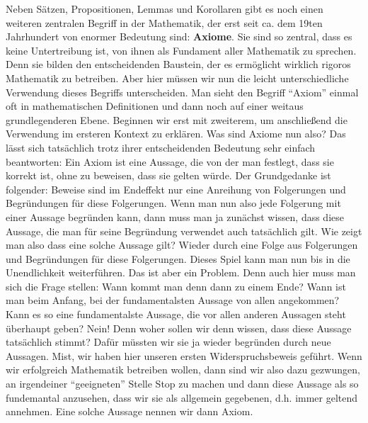 Neben Sätzen, Propositionen, Lemmas und Korollaren gibt es noch einen weiteren zentralen Begriff in der Mathematik, der erst seit ca. dem 19ten Jahrhundert von enormer Bedeutung sind: \textbf{Axiome}. Sie sind so zentral, dass es keine Untertreibung ist, von ihnen als Fundament aller Mathematik zu sprechen. Denn sie bilden den entscheidenden Baustein, der es ermöglicht wirklich rigoros Mathematik zu betreiben. Aber hier müssen wir nun die leicht unterschiedliche Verwendung dieses Begriffs unterscheiden. Man sieht den Begriff "`Axiom"' einmal oft in mathematischen Definitionen und dann noch auf einer weitaus grundlegenderen Ebene. Beginnen wir erst mit zweiterem, um anschließend die Verwendung im ersteren Kontext zu erklären. Was sind Axiome nun also? Das lässt sich tatsächlich trotz ihrer entscheidenden Bedeutung sehr einfach beantworten: Ein Axiom ist eine Aussage, die von der man festlegt, dass sie korrekt ist, ohne zu beweisen, dass sie gelten würde. Der Grundgedanke ist folgender: Beweise sind im Endeffekt nur eine Anreihung von Folgerungen und Begründungen für diese Folgerungen. Wenn man nun also jede Folgerung mit einer Aussage begründen kann, dann muss man ja zunächst wissen, dass diese Aussage, die man für seine Begründung verwendet auch tatsächlich gilt. Wie zeigt man also dass eine solche Aussage gilt? Wieder durch eine Folge aus Folgerungen und Begründungen für diese Folgerungen. Dieses Spiel kann man nun bis in die Unendlichkeit weiterführen. Das ist aber ein Problem. Denn auch hier muss man sich die Frage stellen: Wann kommt man denn dann zu einem Ende? Wann ist man beim Anfang, bei der fundamentalsten Aussage von allen angekommen? Kann es so eine fundamentalste Aussage, die vor allen anderen Aussagen steht überhaupt geben? Nein! Denn woher sollen wir denn wissen, dass diese Aussage tatsächlich stimmt? Dafür müssten wir sie ja wieder begründen durch neue Aussagen. Mist, wir haben hier unseren ersten Widerspruchsbeweis geführt. Wenn wir erfolgreich Mathematik betreiben wollen, dann sind wir also dazu gezwungen, an irgendeiner "`geeigneten"' Stelle Stop zu machen und dann diese Aussage als so fundemantal anzusehen, dass wir sie als allgemein gegebenen, d.h. immer geltend annehmen. Eine solche Aussage nennen wir dann Axiom. 

